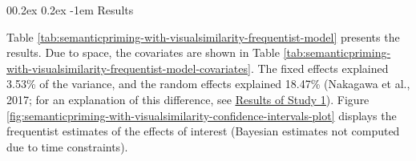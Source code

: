\documentclass[
  12pt,
  man,floatsintext]{apa7}
\makeatletter
\let\oldparagraph\paragraph
\renewcommand{\paragraph}[1]{\oldparagraph{#1}\mbox{}}
\renewcommand{\paragraph}{\@startsection{paragraph}{4}{\parindent}%
  {0\baselineskip \@plus 0.2ex \@minus 0.2ex}%
  {-1em}%
  {\normalfont\normalsize\bfseries\itshape\typesectitle}}
\makeatother
\begin{document}
\hypertarget{results}{%
\paragraph{Results}\label{results}}

Table \ref{tab:semanticpriming-with-visualsimilarity-frequentist-model} presents the results. Due to space, the covariates are shown in Table \ref{tab:semanticpriming-with-visualsimilarity-frequentist-model-covariates}. The fixed effects explained 3.53\% of the variance, and the random effects explained 18.47\% (Nakagawa et al., 2017; for an explanation of this difference, see \protect\hyperlink{semanticpriming-results}{\underline{Results of Study 1}}). Figure \ref{fig:semanticpriming-with-visualsimilarity-confidence-intervals-plot} displays the frequentist estimates of the effects of interest (Bayesian estimates not computed due to time constraints).
\end{document}
